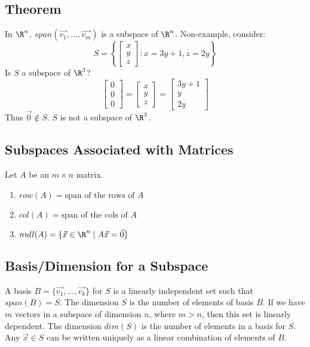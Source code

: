 \documentclass[letterpaper, 12pt]{math}
\begin{document}
\subsection*{Theorem}
In \( \R^n \), \( span(\vec{v_1},\dots,\vec{v_m}) \) is a subspace of
\( \R^n \). Non-example, consider:
\[ S = \left\{\begin{bmatrix}x \\ y \\ z\end{bmatrix}: x = 3y+1, z = 2y
  \right\} \]
Is \( S \) a subspace of \( \R^3 \)?
\[ \begin{bmatrix}0 \\ 0 \\ 0\end{bmatrix} =
  \begin{bmatrix}x \\ y \\ z\end{bmatrix} =
  \begin{bmatrix}3y+1 \\ y \\ 2y\end{bmatrix} \]
Thus \( \vec{0}\notin S \). \( S \) is not a subspace of \( \R^3 \).

\subsection*{Subspaces Associated with Matrices}
Let \( A \) be an \( m\times n \) matrix.
\begin{enumerate}
  \item \( row(A) = \text{span of the rows of } A \)
  \item \( col(A) = \text{span of the cols of } A \)
  \item \( null(A) = \{\vec{x}\in\R^n\mid A\vec{x} = \vec{0}\} \)
\end{enumerate}

\subsection*{Basis/Dimension for a Subspace}
A basis \( B = \{\vec{v_1},\dots,\vec{v_k}\} \) for \( S \) is a linearly
independent set such that \( span(B) = S \). The dimension \( S \) is the
number of elements of basis \( B \). If we have \( m \) vectors in a subspace
of dimension \( n \), where \( m > n \), then this set is linearly dependent.
The dimension \( dim(S) \) is the number of elements in a basis for \( S \).
Any \( \vec{x}\in S \) can be written uniquely as a linear combination of
elements of \( B \).
\end{document}
